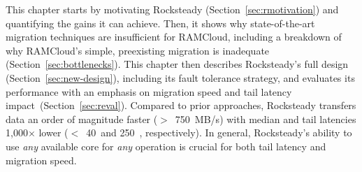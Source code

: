 This chapter starts by motivating Rocksteady
(Section~\ref{sec:rmotivation}) and quantifying the
gains it can achieve. Then, it shows why state-of-the-art migration techniques
are insufficient for RAMCloud, including a breakdown of why RAMCloud's simple,
preexisting migration is inadequate
(Section~\ref{sec:bottlenecks}). This chapter then describes Rocksteady's full design
(Section~\ref{sec:new-design}), including its fault tolerance strategy, and
evaluates
its performance with an emphasis on migration speed and tail latency
impact~(Section~\ref{sec:reval}).
Compared to prior approaches, Rocksteady transfers data an order of magnitude
faster ($>$~750~MB/s) with median and tail latencies 1,000$\times$ lower
($<$~40~\us and
250~\us, respectively). In general, Rocksteady's ability to use {\em any}
available core for {\em any} operation is crucial for both tail latency and
migration speed.
